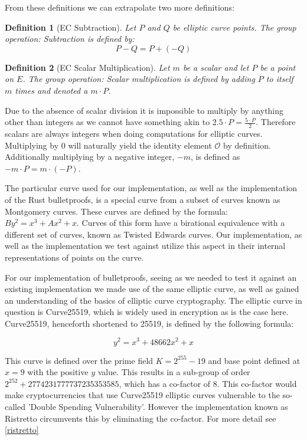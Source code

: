 \documentclass{article}
\newtheorem{definition}{Definition}[section]
\begin{document}
From these definitions we can extrapolate two more definitions:

\begin{definition}[EC Subtraction]
	Let $P$ and $Q$ be elliptic curve points. The group operation:
	Subtraction is defined by:
	$$P-Q = P + (-Q)$$
\end{definition}

\begin{definition}[EC Scalar Multiplication]
	Let $m$ be a scalar and let $P$ be a point on $E$. The group operation:
	Scalar multiplication is defined by adding $P$ to itself $m$ times and
	denoted a $m\cdot P$.
\end{definition}

Due to the absence of scalar division it is impossible to
multiply by anything other than integers as we cannot have something akin to $2.5 \cdot P = \frac{5\cdot P}{2}$. Therefore scalars are always integers when doing computations for elliptic curves. Multiplying by $0$ will
naturally yield the identity element $\mathcal{O}$ by definition.
Additionally multiplying by a negative integer, ${-m}$, is defined as
$-m\cdot P = m\cdot ({-P})$. 

The particular curve used for our implementation, as well as the
implementation of the Rust bulletproofs, is a special curve from a subset
of curves known as Montgomery curves. These curves are defined by the
formula: $By^2 = x^3 + Ax^2 + x$. Curves of this form have a birational
equivalence with a different set of curves, known as Twisted Edwards
curves. Our implementation, as well as the implementation we test against
utilize this aspect in their internal representations of points on the
curve.

For our implementation of bulletproofs, seeing as we needed to test it
against an existing implementation we made use of the same elliptic
curve, as well as gained an understanding of the basics of elliptic
curve cryptography. The elliptic curve in question is Curve25519, which
is widely used in encryption as is the case here. Curve25519, henceforth
shortened to 25519, is defined by the following formula:

$$y^2 = x^3 + 48662x^2 + x$$

This curve is defined over the prime field $K = 2^{255} - 19$ and base
point defined at $x = 9$ with the positive $y$ value. This results in a
sub-group of order $2^{252} + 2774231777737235353585$, which has a
co-factor of $8$. This co-factor would make cryptocurrencies that use
Curve25519 elliptic curves vulnerable to the so-called 'Double Spending
Vulnerability'. However the implementation known as Ristretto circumvents
this by eliminating the co-factor. For more detail see \ref{ristretto}
\end{document}
